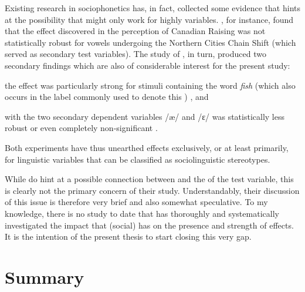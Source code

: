 Existing research in sociophonetics has, in fact, collected some evidence that hints at the possibility that   might only work for highly  variables.
\textcite[cf.][69--75]{niedzielski1999}, for instance, found that the  effect discovered in the perception of Canadian Raising was not statistically robust for vowels undergoing the Northern Cities Chain Shift (which served as secondary test variables).
The \citeyear{hayetal2006a} study of \citeauthor{hayetal2006a}, in turn, produced two secondary findings which are also of considerable interest for the present study:
\begin{inparaenum}[(1)]
	\item the  effect was particularly strong for stimuli containing the word \emph{fish} (which also occurs in the label commonly used to denote this ) \parencite[cf.][363]{hayetal2006a}, and
	\item {} with the two secondary dependent variables /æ/ and /ɛ/ was statistically less robust or even completely non-significant \parencite[cf.][367]{hayetal2006a}.
\end{inparaenum}
Both experiments have thus unearthed  effects exclusively, or at least primarily, for linguistic variables that can be classified as sociolinguistic stereotypes.

While \textcite{hayetal2006a} do hint at a possible connection between   and the  of the test variable, this is clearly not the primary concern of their study.
Understandably, their discussion of this issue is therefore very brief and also somewhat speculative.
To my knowledge, there is no study to date that has thoroughly and systematically investigated the impact that (social)  has on the presence and strength of   effects.
It is the intention of the present thesis to start closing this very gap.

\section{Summary}

